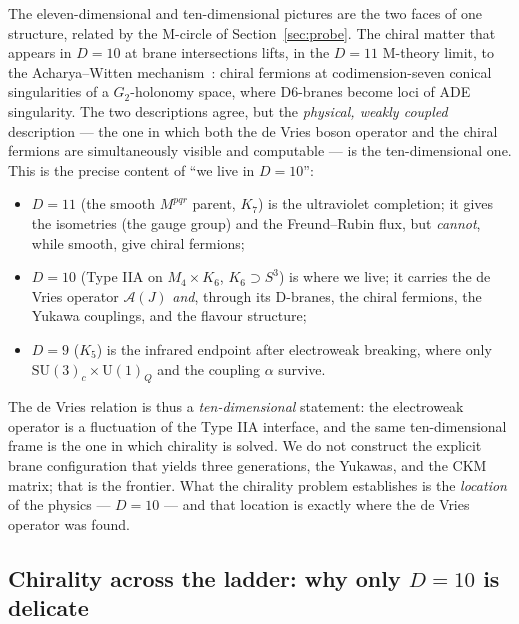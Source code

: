 \documentclass[11pt]{article}
\theoremstyle{plain}
\theoremstyle{definition}
\newcommand{\cA}{\mathcal{A}}
\newcommand{\SU}{\mathrm{SU}}
\newcommand{\U}{\mathrm{U}}
\begin{document}
The eleven-dimensional and ten-dimensional pictures are the two faces of one
structure, related by the M-circle of Section~\ref{sec:probe}. The chiral
matter that appears in $D=10$ at brane intersections lifts, in the $D=11$
M-theory limit, to the Acharya--Witten mechanism~\cite{AcharyaWitten2001}:
chiral fermions at codimension-seven conical singularities of a
$G_2$-holonomy space, where D6-branes become loci of ADE singularity. The two
descriptions agree, but the \emph{physical, weakly coupled} description --- the
one in which both the de Vries boson operator and the chiral fermions are
simultaneously visible and computable --- is the ten-dimensional one. This is
the precise content of ``we live in $D=10$'':
\begin{itemize}
\item $D=11$ (the smooth $M^{pqr}$ parent, $K_7$) is the ultraviolet
completion; it gives the isometries (the gauge group) and the Freund--Rubin
flux, but \emph{cannot}, while smooth, give chiral fermions;
\item $D=10$ (Type IIA on $M_4\times K_6$, $K_6\supset S^3$) is where we live;
it carries the de Vries operator $\cA(J)$ \emph{and}, through its D-branes,
the chiral fermions, the Yukawa couplings, and the flavour structure;
\item $D=9$ ($K_5$) is the infrared endpoint after electroweak breaking, where
only $\SU(3)_c\times\U(1)_Q$ and the coupling $\alpha$ survive.
\end{itemize}
The de Vries relation is thus a \emph{ten-dimensional} statement: the
electroweak operator is a fluctuation of the Type IIA interface, and the same
ten-dimensional frame is the one in which chirality is solved. We do not
construct the explicit brane configuration that yields three generations, the
Yukawas, and the CKM matrix; that is the frontier. What the chirality problem
establishes is the \emph{location} of the physics --- $D=10$ --- and that
location is exactly where the de Vries operator was found.

\subsection{Chirality across the ladder: why only $D=10$ is delicate}
\end{document}
